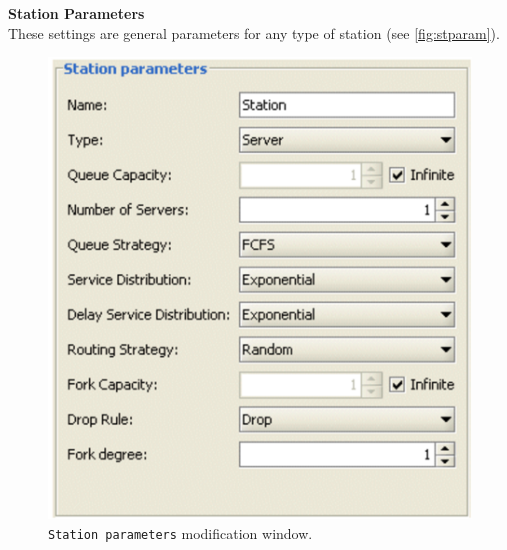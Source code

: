 \noindent \textbf{Station Parameters}\\
These settings are general parameters for any type of station (see
\autoref{fig:stparam}).
\begin{figure}[htb]
    \begin{center}
        \includegraphics[scale=.5]{img/jsimg/9.3.eps}
    \end{center}
    \caption{\texttt{Station parameters} modification window.}
    \label{fig:stparam}
\end{figure}
